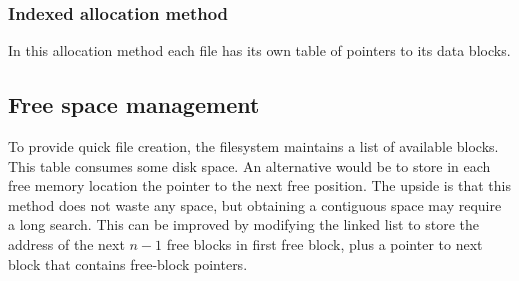 \subsubsection{Indexed allocation method}
In this allocation method each file has its own table of pointers to its data blocks.


\subsection{Free space management}
To provide quick file creation, the filesystem maintains a list of available blocks. This table consumes some disk space. An alternative would be to store in each free memory location the pointer to the next free position. The  upside is that this method does not waste any space, but obtaining a contiguous space may require a long search. This can be improved by modifying the linked list to store the address of the next $n-1$ free blocks in first free block, plus a pointer to next block that contains free-block pointers.


